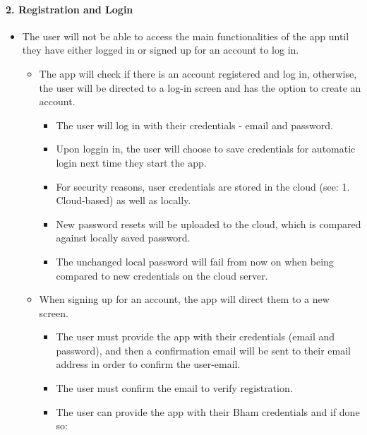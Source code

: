 \documentclass[a4paper,11pt]{article} %
\begin{document}
\hypertarget{registration-and-login}{%
\paragraph{2. Registration and Login}\label{registration-and-login}}

\begin{itemize}
 
\item
  The user will not be able to access the main functionalities of the
  app until they have either logged in or signed up for an account to
  log in.

  \begin{itemize}
   
  \item
    The app will check if there is an account registered and log in,
    otherwise, the user will be directed to a log-in screen and has the
    option to create an account.

    \begin{itemize}
     
    \item
      The user will log in with their credentials - email and password.
    \item
      Upon loggin in, the user will choose to save credentials for
      automatic login next time they start the app.
    \item
      For security reasons, user credentials are stored in the cloud
      (see: 1. Cloud-based) as well as locally.
    \item
      New password resets will be uploaded to the cloud, which is
      compared against locally saved password.
    \item
      The unchanged local password will fail from now on when being
      compared to new credentials on the cloud server.
    \end{itemize}
  \item
    When signing up for an account, the app will direct them to a new
    screen.

    \begin{itemize}
     
    \item
      The user must provide the app with their credentials (email and
      password), and then a confirmation email will be sent to their
      email address in order to confirm the user-email.
    \item
      The user must confirm the email to verify registration.
    \item
      The user can provide the app with their Bham credentials and if
      done so:


\end{itemize}
\end{itemize}
\end{itemize}
\end{document}

